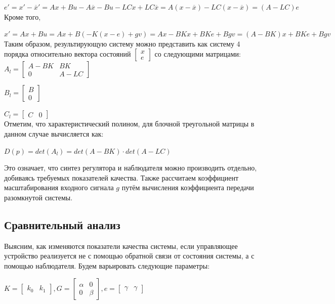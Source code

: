 $e'=x'-\overline{x}'=Ax+Bu-A\overline{x}-Bu-LCx+LC\overline{x}=A(x-\overline{x})-LC(x-\overline{x})=(A-LC)e$\\

Кроме того,

$x'=Ax+Bu=Ax+B(-K(x-e)+gv)=Ax-BKx+BKe+Bgv=(A-BK)x+BKe+Bgv$\\

Таким образом, результирующую систему можно представить как систему 4 порядка относительно вектора состояний
$\begin{bmatrix} x \\ e \end{bmatrix}$
со следующими матрицами:\\

$A_{l}=\begin{bmatrix} A-BK & BK \\ 0 & A-LC \end{bmatrix}$

$B_{l}=\begin{bmatrix} B \\ 0 \end{bmatrix}$

$C_{l}=\begin{bmatrix} C & 0 \end{bmatrix}$\\

Отметим, что характеристический полином, для блочной треугольной матрицы в данном случае вычисляется как:

$D(p)=det(A_{l})=det(A-BK)\cdot det(A-LC)$

Это означает, что синтез регулятора и наблюдателя можно производить отдельно, добиваясь требуемых показателей качества. Также рассчитаем коэффициент масштабирования входного сигнала $g$ путём вычисления коэффициента передачи разомкнутой системы.


\subsection{Сравнительный анализ}

Выясним, как изменяются показатели качества системы, если управляющее устройство реализуется не с помощью обратной связи от состояния системы, а с помощью наблюдателя. Будем варьировать следующие параметры:

\begin{center}
$K=\begin{bmatrix} k_0 & k_1 \end{bmatrix}, G=\begin{bmatrix} \alpha & 0 \\ 0 & \beta \end{bmatrix}, e=\begin{bmatrix} \gamma & \gamma \end{bmatrix}$
\end{center}


